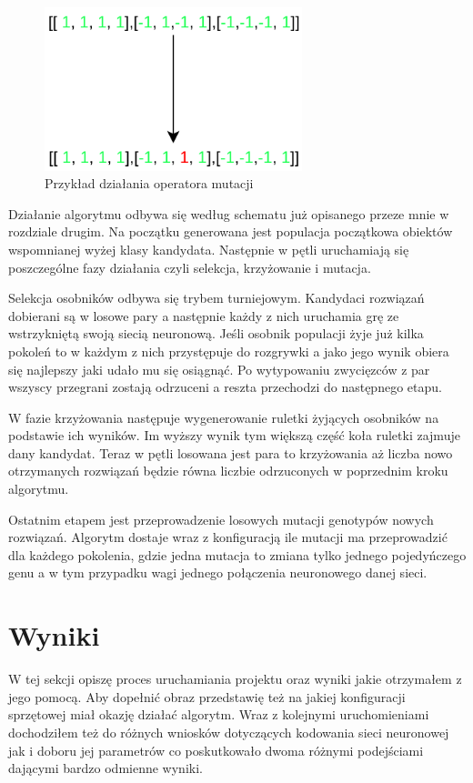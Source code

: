 \documentclass[12pt, oneside, a4paper]{report}
\begin{document}
\begin{figure}[h]
	\centering
	\includegraphics[width=7.5cm]{fig432.png}
	\caption{Przykład działania operatora mutacji}
	\label{fig: 4.3.mutation}
\end{figure}

Działanie algorytmu odbywa się według schematu już opisanego przeze mnie w rozdziale drugim. Na początku generowana jest populacja początkowa obiektów wspomnianej wyżej klasy kandydata. Następnie w pętli uruchamiają się poszczególne fazy działania czyli selekcja, krzyżowanie i mutacja.

Selekcja osobników odbywa się trybem turniejowym. Kandydaci rozwiązań dobierani są w losowe pary a następnie każdy z nich uruchamia grę ze wstrzykniętą swoją siecią neuronową. Jeśli osobnik populacji żyje już kilka pokoleń to w każdym z nich przystępuje do rozgrywki a jako jego wynik obiera się najlepszy jaki udało mu się osiągnąć. Po wytypowaniu zwycięzców z par wszyscy przegrani zostają odrzuceni a reszta przechodzi do następnego etapu.

W fazie krzyżowania następuje wygenerowanie ruletki żyjących osobników na podstawie ich wyników. Im wyższy wynik tym większą część koła ruletki zajmuje dany kandydat. Teraz w pętli losowana jest para to krzyżowania aż liczba nowo otrzymanych rozwiązań będzie równa liczbie odrzuconych w poprzednim kroku algorytmu.

Ostatnim etapem jest przeprowadzenie losowych mutacji genotypów nowych rozwiązań. Algorytm dostaje wraz z konfiguracją ile mutacji ma przeprowadzić dla każdego pokolenia, gdzie jedna mutacja to zmiana tylko jednego pojedyńczego genu a w tym przypadku wagi jednego połączenia neuronowego danej sieci.

\section{Wyniki}

W tej sekcji opiszę proces uruchamiania projektu oraz wyniki jakie otrzymałem z jego pomocą. Aby dopełnić obraz przedstawię też na jakiej konfiguracji sprzętowej miał okazję działać algorytm. Wraz z kolejnymi uruchomieniami dochodziłem też do różnych wniosków dotyczących kodowania sieci neuronowej jak i doboru jej parametrów co poskutkowało dwoma różnymi podejściami dającymi bardzo odmienne wyniki.
\end{document}
